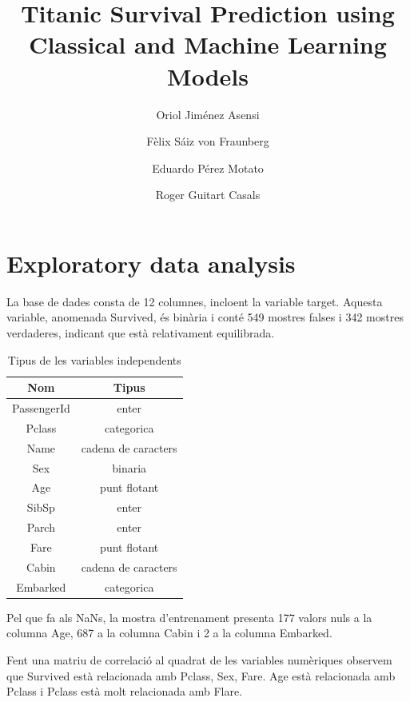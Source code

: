 \documentclass[9pt,a4paper,twoside]{tau-class/tau}
\title{Titanic Survival Prediction using Classical and Machine Learning Models}
\author[a,1]{Oriol Jiménez Asensi}
\author[b,2]{Fèlix Sáiz von Fraunberg}
\author[c,3]{Eduardo Pérez Motato}
\author[d,4]{Roger Guitart Casals}
\affil[a]{1641014}
\affil[b]{1620854}
\affil[c]{1709992}
\affil[d]{1711342}
\begin{document}
    \maketitle 
    \thispagestyle{firststyle} \tauabstract 
    \tableofcontents
    \linenumbers 
    

\section{Exploratory data analysis}

    La base de dades consta de 12 columnes, incloent la variable target. Aquesta variable, anomenada Survived, és binària i conté 549 mostres falses i 342 mostres verdaderes, indicant que està relativament equilibrada.

    \begin{table}[H]
		\centering
		\caption{Tipus de les variables independents}
		\label{tab:tipus_variables}
		\begin{tabular}{cc}
			\toprule
			\textbf{Nom} & \textbf{Tipus}\\
			\midrule
			PassengerId & enter\\
            Pclass & categorica\\
            Name & cadena de caracters\\
            Sex & binaria\\
            Age & punt flotant\\
            SibSp & enter\\
            Parch & enter\\
            Fare & punt flotant\\
            Cabin & cadena de caracters\\
            Embarked & categorica\\ 
			\bottomrule
		\end{tabular}			
	\end{table}

Pel que fa als NaNs, la mostra d'entrenament presenta 177 valors nuls a la columna Age, 687 a la columna Cabin i 2 a la columna Embarked. 

Fent una matriu de correlació al quadrat de les variables numèriques observem que Survived està relacionada amb Pclass, Sex, Fare. Age està relacionada amb Pclass i Pclass està molt relacionada amb Flare.
\end{document}
